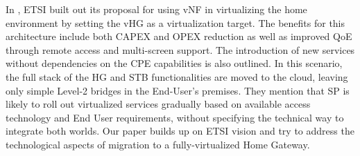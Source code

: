 In \cite{_network_2013}, ETSI built out its proposal for using vNF in virtualizing the home environment by setting the vHG as a virtualization target.
The benefits for this architecture include both CAPEX and OPEX reduction as well as improved QoE through remote access and multi-screen support.
The introduction of new services without dependencies on the CPE capabilities is also outlined.
In this scenario, the full stack of the HG and STB functionalities are moved to the cloud, leaving only simple Level-2 bridges in the End-User's premises.
They mention that SP is likely to roll out virtualized services gradually based on available access technology and End User requirements, without specifying the technical way to integrate both worlds.
Our paper builds up on ETSI vision and try to address the technological aspects of migration to a fully-virtualized Home Gateway.



